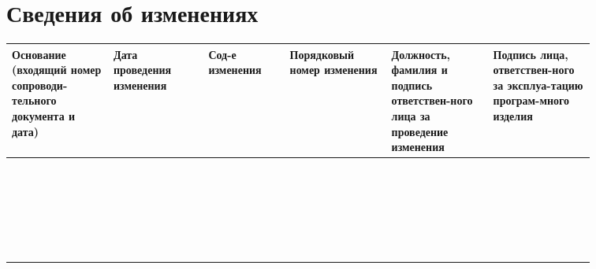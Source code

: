 \documentclass[14pt,a4paper,final]{extreport}
\newlength{\rs}
\begin{document}
\newpage

\chapter{Сведения об изменениях}

\begin{center}
	\small	\begin{longtable}{|p{0.15\linewidth}|p{0.14\linewidth}|p{0.12\linewidth}|p{0.15\linewidth}|p{0.15\linewidth}|p{0.15\linewidth}|}
		
		\hline
		\textbf{Основание (входящий номер сопроводи-\newline тельного документа и дата)} &
		\textbf{Дата проведения изменения} &
		\textbf{Сод-е изменения} &
		\textbf{Порядковый номер изменения} &
		\textbf{Должность, фамилия и подпись ответствен-\newline ного лица за проведение изменения} &
		\textbf{Подпись лица, ответствен-\newline ного за эксплуа-\newline тацию програм-\newline много изделия} \\
		
		
		
		
		\endfirsthead
		
		
		\endfoot
		\hline
		\endlastfoot
		
		& & & & & \\ \hline
		& & & & & \\ \hline
		& & & & & \\ \hline
		& & & & & \\ \hline
		& & & & & \\ \hline
		& & & & & \\ \hline
		& & & & & \\ \hline
		& & & & & \\ \hline
		& & & & & \\ \hline
		& & & & & \\ \hline
		& & & & & \\ \hline
		& & & & & \\ \hline
		& & & & & \\ \hline
		& & & & & \\ \hline
		& & & & & \\ \hline
		& & & & & \\ \hline
		& & & & & \\ \hline
		& & & & & \\ \hline
		& & & & & \\ \hline
		& & & & & \\ \hline
		& & & & & \\ \hline
		& & & & & \\ \hline
		& & & & & \\ \hline
		& & & & & \\ \hline
		& &  & & & \\ 
		
		
		
		
		
	\end{longtable}
\end{center}
\end{document}
